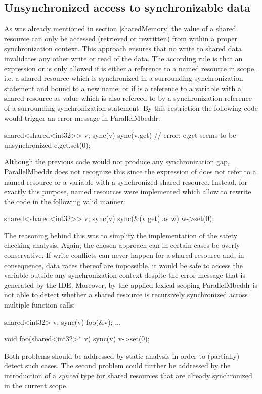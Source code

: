 \subsection{Unsynchronized access to synchronizable data}
As was already mentioned in section \ref*{sharedMemory} the value of a shared resource can only be accessed (retrieved or rewritten) from within a proper synchronization context. This approach ensures that no write to shared data invalidates any other write or read of the data. The according rule is that an expression  or  is only allowed if  is either a reference to a named resource in scope, i.e. a shared resource which is synchronized in a surrounding synchronization statement and bound to a new name; or if  is a reference to a variable with a shared resource as value which is also refereed to by a synchronization reference of a surrounding synchronization statement. By this restriction the following code would trigger an error message in ParallelMbeddr:
\begin{ccode}
shared<shared<int32>> v;
sync(v) {
  sync(v.get) {
    // error: e.get seems to be unsynchronized
    e.get.set(0);
  }
}
\end{ccode}
Although the previous code would not produce any synchronization gap, ParallelMbeddr does not recognize this since the expression  of  does not refer to a named resource or a variable with a synchronized shared resource. Instead, for exactly this purpose, named resources were implemented which allow to rewrite the code in the following valid manner:
\begin{ccode}
shared<shared<int32>> v;
sync(v) {
  sync(&(v.get) as w) {
    w->set(0);
  }
}
\end{ccode}
The reasoning behind this was to simplify the implementation of the safety checking analysis. Again, the chosen approach can in certain cases be overly conservative. If write conflicts can never happen for a shared resource and, in consequence, data races thereof are impossible, it would be safe to access the variable outside any synchronization context despite the error message that is generated by the IDE. Moreover, by the applied lexical scoping ParallelMbeddr is not able to detect whether a shared resource is recursively synchronized across multiple function calls:
\begin{ccode}
  shared<int32> v;
  sync(v) { foo(&v); }
  ...

void foo(shared<int32>* v) {
  sync(v) { v->set(0); }
}
\end{ccode}
Both problems should be addressed by static analysis in order to (partially) detect such cases. The second problem could further be addressed by the introduction of a \textit{synced} type for shared resources that are already synchronized in the current scope.

